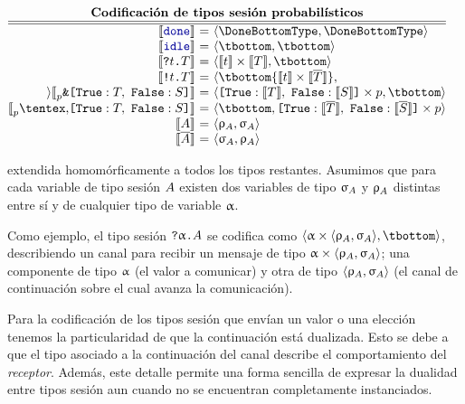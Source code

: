 \begin{center}
$\displaystyle
  \begin{array}{@{}c@{}}
    \textbf{Codificación de tipos sesión probabilísticos} \\
    \hline
    \hline
    \begin{array}[t]{@{}r@{~}c@{~}l@{}}
      \encfun\Done
      & = &
      \tsession\DoneBottomType\DoneBottomType
      \\
      \encfun\Idle
      & = &
      \tsession\tbottom\tbottom
      \\
      \encfun{\In\Type\SessionType}
      & = &
      \tsession{\encfun\Type\tmul\encfun\SessionType}\tbottom
      \\
      \encfun{\Out\Type\SessionType}
      & = &
      \tsession\tbottom{\encfun\Type\tmul\encfun{\dual\SessionType}}
      \\
      \encfun{\BinaryPBranch[p]{\SessionTypeT}{\SessionTypeS}}
      & = &
      \tsession{\BinaryLabels{\encfun{\SessionTypeT}}{\encfun{\SessionTypeS}}\tmul p}\tbottom
      \\
      \encfun{\BinaryPChoice[p]{\SessionTypeT}{\SessionTypeS}}
      & = &
      \tsession{\tbottom}{\BinaryLabels{\encfun{\dual\SessionTypeT}}{\encfun{\dual\SessionTypeS}}\tmul p}
      \\
      \encfun\etvar
      & = &
      \tsession{\renc\etvar}{\senc\etvar}
      \\
      \encfun{\sdual\etvar}
      & = &
      \tsession{\senc\etvar}{\renc\etvar}
    \end{array}
  \end{array}
$
\end{center}

extendida homomórficamente a todos los tipos restantes. Asumimos que para cada
variable de tipo sesión $A$ existen dos variables de tipo $\upsigma_{A}$ y
$\uprho_{A}$ distintas entre sí y de cualquier tipo de variable $\upalpha$.

Como ejemplo, el tipo sesión ${\texttt{\upshape?}}{\upalpha}\texttt{\upshape.}A$ se codifica como
$\tsession{\tvar \tmul \tsession{\renc\etvar}{\senc\etvar}}\tbottom$,
describiendo un canal para recibir un mensaje de tipo $\upalpha \times
\langle\uprho_{A},\upsigma_{A}\rangle$; una componente de tipo $\upalpha$ (el valor a
comunicar) y otra de tipo $\langle\uprho_{A},\upsigma_{A}\rangle$ (el canal de
continuación sobre el cual avanza la comunicación).

Para la codificación de los tipos sesión que envían un valor o una elección
tenemos la particularidad de que la continuación está dualizada. Esto se debe a
que el tipo asociado a la continuación del canal describe el comportamiento del
\emph{receptor}. Además, este detalle permite una forma sencilla de expresar la
dualidad entre tipos sesión aun cuando no se encuentran completamente
instanciados.

